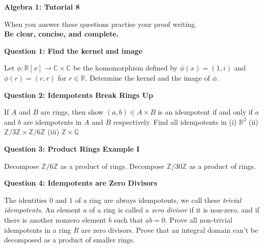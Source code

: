 \documentclass[11pt,twoside, a4paper]{report}
\theoremstyle{plain}
\theoremstyle{definition}
\begin{document}
\begin{center}
 \noindent\makebox[\linewidth]{\rule{14cm}{1.5pt}} 
{\bf Algebra 1: Tutorial 8 }
 \noindent\makebox[\linewidth]{\rule{14cm}{1.5pt}}  
 \noindent\makebox[\linewidth]{\rule{14cm}{3pt}}
\end{center}

\noindent When you answer these questions practise your proof writing.\\
  {\bf Be clear, concise, and complete.}
  
  \begin{center}
{\bf Question 1: Find the kernel and image}
\end{center} 

Let $\phi: \mathbb{R}[x] \rightarrow \mathbb{C} \times \mathbb{C}$ be the homomorphism defined by $\phi(x) = (1, i)$ and $\phi(r) = (r,r)$ for $r \in \mathbb{R}$. Determine the kernel and the image of $\phi$. 

\begin{center}
{\bf Question 2: Idempotents Break Rings Up}
\end{center} 

If $A$ and $B$ are rings, then show $(a,b) \in A\times B$ is an idempotent if and only if $a$ and $b$ are idempotents in $A$ and $B$ respectively. Find all idempotents in (i) $\mathbb{R}^{2}$ (ii) $\mathbb{Z}/3\mathbb{Z} \times \mathbb{Z}/6\mathbb{Z}$ (iii) $\mathbb{Z}\times\mathbb{Q}$


\begin{center}
{\bf Question 3: Product Rings Example I}
\end{center}

Decompose $\mathbb{Z}/6\mathbb{Z}$ as a product of rings. Decompose $\mathbb{Z}/30\mathbb{Z}$ as a product of rings. 



\begin{center}
{\bf Question 4: Idempotents are Zero Divisors}
\end{center}

The identities $0$ and $1$ of a ring are always idempotents, we call these \emph{trivial idempotents}. An element $a$ of a ring is called a \emph{zero divisor} if it is non-zero, and if there is another nonzero element $b$ such that $ab=0$. Prove all non-trivial idempotents in a ring $R$ are zero divisors. Prove that an integral domain can't be decomposed as a product of smaller rings. 
\end{document}
